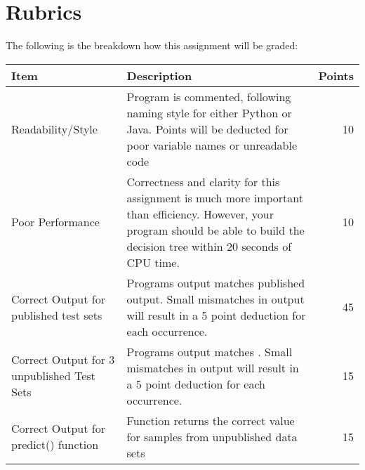 \documentclass[11pt,letterpaper]{article}
\begin{document}
\section*{Rubrics}
The following is the breakdown how this assignment will be graded: \\
\begin{tabular}{| l | p{8 cm} | r |} 
\hline
Item & Description & Points \\ \hline
Readability/Style &  Program is commented, following naming style for either Python or Java.  Points will be 
deducted for poor variable names or unreadable code & 10 \\ \hline

Poor Performance &  Correctness and clarity for this assignment is much more important than efficiency.  However,
your program should be able to build the decision tree within 20 seconds of CPU time. & 10 \\ \hline

Correct Output for published test sets &  Programs output matches published output.  Small mismatches
in output will result in a 5 point deduction for each occurrence.  & 45\\ \hline

Correct Output for 3 unpublished Test Sets &  Programs output matches .  Small mismatches
in output will result in a 5 point deduction for each occurrence.  & 15 \\ \hline
Correct Output for predict() function  & Function
returns the correct value for samples from unpublished data sets& 15 \\ \hline

\end{tabular}
\end{document}
